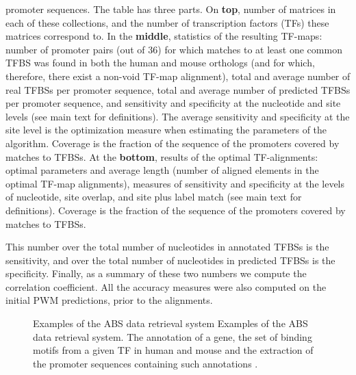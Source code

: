 \begin{landscape}
\begin{table}[t!]
\begin{center}
{           promoter sequences. 
           The table has three parts. 
           On {\bf top},  number of matrices in each of these collections, and 
           the number of transcription factors (TFs) these matrices correspond to. 
           In the {\bf middle}, statistics of the resulting TF-maps: 
           number of promoter pairs (out of 36) for which matches to at least one 
           common TFBS was found in both the human and mouse orthologs 
           (and for which, therefore, there exist a non-void TF-map alignment), 
           total and average number of 
           real TFBSs per promoter sequence, total and average number of 
           predicted TFBSs per promoter sequence, and sensitivity and specificity 
           at the nucleotide and site levels (see main text for definitions). The 
           average sensitivity and specificity at the site level is the optimization 
           measure when estimating the parameters of the algorithm. Coverage is 
           the fraction of the sequence of the promoters covered by matches to TFBSs.
           At the {\bf bottom}, results of the optimal TF-alignments:
           optimal parameters and average length (number of aligned elements in the 
           optimal TF-map alignments), measures of sensitivity and specificity at the
           levels of nucleotide, site overlap, and site plus label match (see main 
           text for definitions). Coverage is the fraction of the sequence of the 
           promoters covered by matches to TFBSs.}
\end{center}
\end{table}
\end{landscape}

This number over the
total number of nucleotides in annotated TFBSs is the sensitivity, and over 
the total number of nucleotides in predicted TFBSs is the
specificity. Finally, as a summary of these two numbers we compute the
correlation coefficient. All the accuracy measures were also computed on
the initial PWM predictions, prior to the alignments.  

\begin{figure}[t!]
\begin{center}
\setlength{\fboxsep}{0pt}
          {Examples of the ABS data retrieval system}%
          {Examples of the ABS data retrieval system.}%
          {The annotation of a gene, the set of binding motifs from a given TF in human 
           and mouse and the extraction of the promoter sequences containing such annotations
           \citep{blanco:2006a}.}%
\end{center}
\end{figure}

